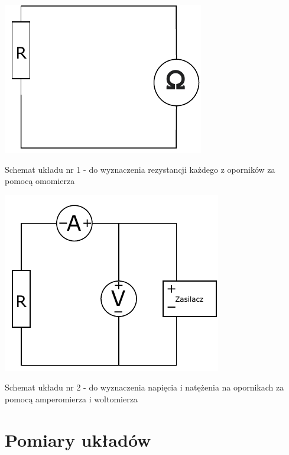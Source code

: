\documentclass[12pt]{article}
\begin{document}
\pagebreak

\includegraphics{obwod1.pdf}

Schemat układu nr 1 - do wyznaczenia rezystancji każdego z oporników
za pomocą omomierza

\includegraphics{obwod2.pdf}

Schemat układu nr 2 - do wyznaczenia napięcia i natężenia na opornikach za pomocą
amperomierza i woltomierza

\section{Pomiary układów}
\end{document}
